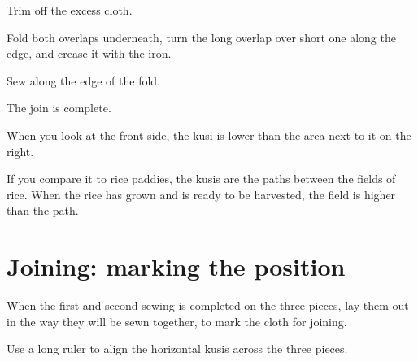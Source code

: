 \clearpage

Trim off the excess cloth.

\begin{multicols}{2}
\setlength{\nextPhotoWidth}{\linewidth}


\columnbreak
\setlength{\nextPhotoWidth}{\linewidth}


\end{multicols}

\vspace*{-\baselineskip}
\enlargethispage*{\baselineskip}

Fold both overlaps underneath, turn the long overlap over short one
along the edge, and crease it with the iron.


Sew along the edge of the fold.


The join is complete.



When you look at the front side, the kusi is lower than the area next to
it on the right.

If you compare it to rice paddies, the kusis are the paths between the
fields of rice. When the rice has grown and is ready to be harvested,
the field is higher than the path.

\section{Joining: marking the position}

When the first and second sewing is completed on the three pieces, lay
them out in the way they will be sewn together, to mark the cloth for
joining.

Use a long ruler to align the horizontal kusis across the three pieces.

\begin{multicols}{2}
\setlength{\nextPhotoWidth}{\linewidth}


\columnbreak
\setlength{\nextPhotoWidth}{\linewidth}


\end{multicols}

